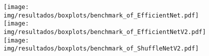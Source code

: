 \begin{figure}[h!]
	\texttt{[image: img/resultados/boxplots/benchmark\_of\_EfficientNet.pdf]}
	\texttt{[image: img/resultados/boxplots/benchmark\_of\_EfficientNetV2.pdf]}
	\texttt{[image: img/resultados/boxplots/benchmark\_of\_ShuffleNetV2.pdf]}
	\caption{}
	\label{fig:Time_of_Efficiency Oriented}
\end{figure}
